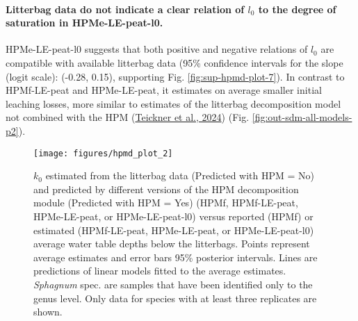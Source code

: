 \documentclass[
  12pt,
]{article}
\begin{document}
\hypertarget{litterbag-data-do-not-indicate-a-clear-relation-of-l_0-to-the-degree-of-saturation-in-hpme-le-peat-l0.}{%
\paragraph*{\texorpdfstring{Litterbag data do not indicate a clear relation of \(l_0\) to the degree of saturation in HPMe-LE-peat-l0.}{Litterbag data do not indicate a clear relation of l\_0 to the degree of saturation in HPMe-LE-peat-l0.}}\label{litterbag-data-do-not-indicate-a-clear-relation-of-l_0-to-the-degree-of-saturation-in-hpme-le-peat-l0.}}

HPMe-LE-peat-l0 suggests that both positive and negative relations of \(l_0\) are compatible with available litterbag data (95\% confidence intervals for the slope (logit scale): (-0.28, 0.15), supporting Fig. \ref{fig:sup-hpmd-plot-7}). In contrast to HPMf-LE-peat and HPMe-LE-peat, it estimates on average smaller initial leaching losses, more similar to estimates of the litterbag decomposition model not combined with the HPM (\protect\hyperlink{ref-Teickner.2024}{Teickner et al., 2024}) (Fig. \ref{fig:out-sdm-all-models-p2}).



\begin{figure}[H]

{\centering \texttt{[image: figures/hpmd\_plot\_2]} 

}

\caption{\(k_0\) estimated from the litterbag data (Predicted with HPM = No) and predicted by different versions of the HPM decomposition module (Predicted with HPM = Yes) (HPMf, HPMf-LE-peat, HPMe-LE-peat, or HPMe-LE-peat-l0) versus reported (HPMf) or estimated (HPMf-LE-peat, HPMe-LE-peat, or HPMe-LE-peat-l0) average water table depths below the litterbags. Points represent average estimates and error bars 95\% posterior intervals. Lines are predictions of linear models fitted to the average estimates. \emph{Sphagnum} spec. are samples that have been identified only to the genus level. Only data for species with at least three replicates are shown.}\label{fig:out-p-hpm-mm27-2-mm29-1-mm30-1-p2}
\end{figure}
\end{document}
